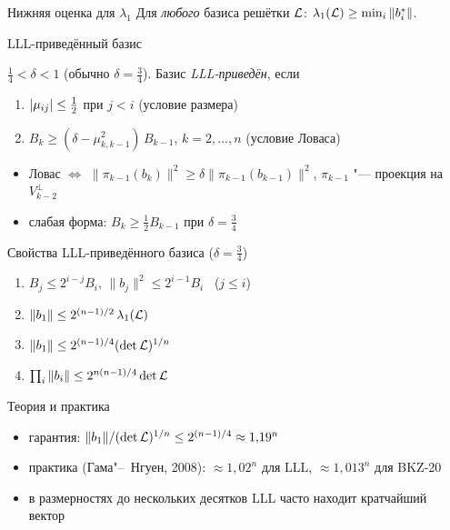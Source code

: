 \documentclass{ca-slides}
\begin{document}
\begin{theoremframe}[lemma]{Нижняя оценка для $\lambda_1$}
  Для \emph{любого} базиса решётки $\mathcal{L}$: \quad
  $\lambda_1(\mathcal{L}) \ge \min_i \|b_i^*\|$.
\end{theoremframe}

\begin{canvasframe}{LLL-приведённый базис}
  \begin{definition}
    $\tfrac14 < \delta < 1$ (обычно $\delta = \tfrac34$). Базис \emph{LLL-приведён}, если
    \begin{enumerate}
      \item $\lvert\mu_{ij}\rvert \le \tfrac12$ при $j < i$ \hfill (условие размера)
      \item $B_k \ge (\delta - \mu_{k,k-1}^2)\, B_{k-1}$, $k = 2, \dots, n$
        \hfill (условие Ловаса)
    \end{enumerate}
  \end{definition}
  \begin{itemize}
    \item Ловас $\iff$ $\|\pi_{k-1}(b_k)\|^2 \ge \delta \|\pi_{k-1}(b_{k-1})\|^2$,
      $\pi_{k-1}$ "--- проекция на $V_{k-2}^\perp$
    \item слабая форма: $B_k \ge \tfrac12 B_{k-1}$ при $\delta = \tfrac34$
  \end{itemize}
\end{canvasframe}

\begin{theoremframe}{Свойства LLL-приведённого базиса ($\delta = \frac34$)}
  \begin{enumerate}
    \item $B_j \le 2^{i-j} B_i$, \quad $\|b_j\|^2 \le 2^{i-1} B_i$ \ ($j \le i$)
    \item $\|b_1\| \le 2^{(n-1)/2}\, \lambda_1(\mathcal{L})$
    \item $\|b_1\| \le 2^{(n-1)/4} (\det \mathcal{L})^{1/n}$
    \item $\prod_i \|b_i\| \le 2^{n(n-1)/4} \det \mathcal{L}$
  \end{enumerate}
\end{theoremframe}

\begin{canvasframe}{Теория и практика}
  \begin{itemize}
    \item гарантия: $\|b_1\| / (\det\mathcal{L})^{1/n} \le 2^{(n-1)/4} \approx 1{,}19^n$
    \item практика (Гама"--~Нгуен, 2008): $\approx 1{,}02^n$ для LLL, $\approx 1{,}013^n$
      для BKZ-20
    \item в размерностях до нескольких десятков LLL часто находит кратчайший вектор
  \end{itemize}
  \notearea[0.2\textheight]
\end{canvasframe}
\end{document}
